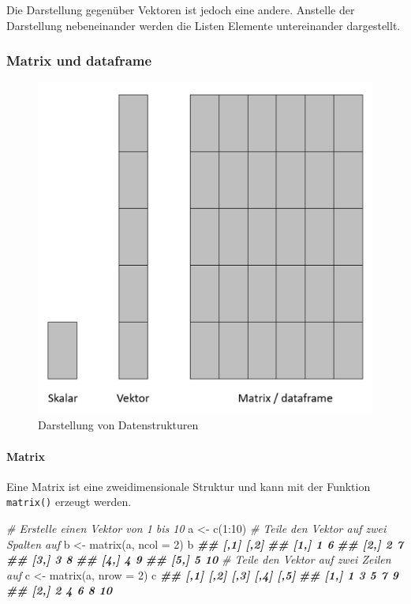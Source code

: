 \documentclass[
]{article}
\newenvironment{Shaded}{\begin{snugshade}}{\end{snugshade}}
\newcommand{\AttributeTok}[1]{\textcolor[rgb]{0.77,0.63,0.00}{#1}}
\newcommand{\CommentTok}[1]{\textcolor[rgb]{0.56,0.35,0.01}{\textit{#1}}}
\newcommand{\DecValTok}[1]{\textcolor[rgb]{0.00,0.00,0.81}{#1}}
\newcommand{\DocumentationTok}[1]{\textcolor[rgb]{0.56,0.35,0.01}{\textbf{\textit{#1}}}}
\newcommand{\FunctionTok}[1]{\textcolor[rgb]{0.00,0.00,0.00}{#1}}
\newcommand{\NormalTok}[1]{#1}
\newcommand{\OtherTok}[1]{\textcolor[rgb]{0.56,0.35,0.01}{#1}}
\newcommand{\SpecialCharTok}[1]{\textcolor[rgb]{0.00,0.00,0.00}{#1}}
\begin{document}
Die Darstellung gegenüber Vektoren ist jedoch eine andere. Anstelle der Darstellung nebeneinander werden die Listen Elemente untereinander dargestellt.

\hypertarget{matrix-und-dataframe}{%
\subsubsection{Matrix und dataframe}\label{matrix-und-dataframe}}

\begin{figure}

{\centering \includegraphics[width=0.5\linewidth]{images/020} 

}

\caption{Darstellung von Datenstrukturen}\label{fig:unnamed-chunk-68}
\end{figure}

\hypertarget{matrix}{%
\paragraph{Matrix}\label{matrix}}

Eine Matrix ist eine zweidimensionale Struktur und kann mit der Funktion \texttt{matrix()} erzeugt werden.

\begin{Shaded}
\begin{Highlighting}[]
\CommentTok{\# Erstelle einen Vektor von 1 bis 10}
\NormalTok{a }\OtherTok{\textless{}{-}} \FunctionTok{c}\NormalTok{(}\DecValTok{1}\SpecialCharTok{:}\DecValTok{10}\NormalTok{)}
\CommentTok{\# Teile den Vektor auf zwei Spalten auf}
\NormalTok{b }\OtherTok{\textless{}{-}} \FunctionTok{matrix}\NormalTok{(a, }\AttributeTok{ncol =} \DecValTok{2}\NormalTok{)}
\NormalTok{b}
\DocumentationTok{\#\#      [,1] [,2]}
\DocumentationTok{\#\# [1,]    1    6}
\DocumentationTok{\#\# [2,]    2    7}
\DocumentationTok{\#\# [3,]    3    8}
\DocumentationTok{\#\# [4,]    4    9}
\DocumentationTok{\#\# [5,]    5   10}
\CommentTok{\# Teile den Vektor auf zwei Zeilen auf}
\NormalTok{c }\OtherTok{\textless{}{-}} \FunctionTok{matrix}\NormalTok{(a, }\AttributeTok{nrow =} \DecValTok{2}\NormalTok{)}
\NormalTok{c}
\DocumentationTok{\#\#      [,1] [,2] [,3] [,4] [,5]}
\DocumentationTok{\#\# [1,]    1    3    5    7    9}
\DocumentationTok{\#\# [2,]    2    4    6    8   10}
\end{Highlighting}
\end{Shaded}
\end{document}
